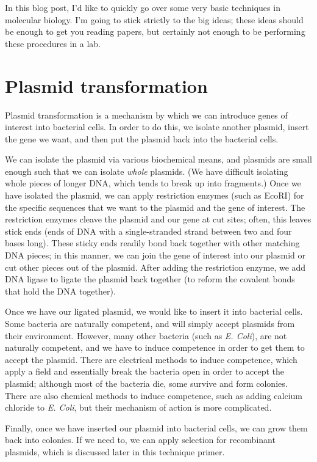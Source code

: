 \documentclass{article}
\begin{document}
In this blog post, I'd like to quickly go over some very basic techniques in molecular biology. I'm
going to stick strictly to the big ideas; these ideas should be enough to get you reading papers,
but certainly not enough to be performing these procedures in a lab.

\section*{Plasmid transformation}
Plasmid transformation is a mechanism by which we can introduce genes of interest into bacterial
cells. In order to do this, we isolate another plasmid, insert the gene we want, and then put the
plasmid back into the bacterial cells.

We can isolate the plasmid via various biochemical means, and plasmids are small enough such that we
can isolate \emph{whole} plasmids. (We have difficult isolating whole pieces of longer DNA, which
tends to break up into fragments.) Once we have isolated the plasmid, we can apply restriction
enzymes (such as EcoRI) for the specific sequences that we want to the plasmid and the gene of
interest. The restriction enzymes cleave the plasmid and our gene at cut sites; often, this leaves
stick ends (ends of DNA with a single-stranded strand between two and four bases long). These sticky
ends readily bond back together with other matching DNA pieces; in this manner, we can join the gene
of interest into our plasmid or cut other pieces out of the plasmid. After adding the restriction
enzyme, we add DNA ligase to ligate the plasmid back together (to reform the covalent bonds that
hold the DNA together).

Once we have our ligated plasmid, we would like to insert it into bacterial cells. Some bacteria are
naturally competent, and will simply accept plasmids from their environment. However, many other
bacteria (such as \emph{E. Coli}), are not naturally competent, and we have to induce competence in
order to get them to accept the plasmid. There are electrical methods to induce competence, which
apply a field and essentially break the bacteria open in order to accept the plasmid; although most
of the bacteria die, some survive and form colonies. There are also chemical methods to induce
competence, such as adding calcium chloride to \emph{E. Coli}, but their mechanism of action is more
complicated.

Finally, once we have inserted our plasmid into bacterial cells, we can grow them back into
colonies. If we need to, we can apply selection for recombinant plasmids, which is discussed later
in this technique primer.
\end{document}
